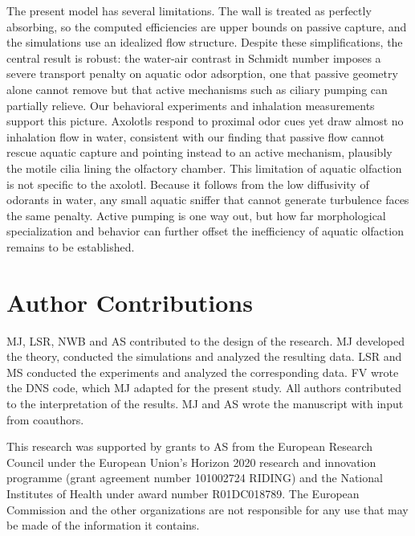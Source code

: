 \documentclass[%
 twocolumn,
 amsmath,amssymb,
 aps,prfluids,
 superscriptaddress,
]{revtex4-2}
\begin{document}
The present model has several limitations. The wall is treated as perfectly absorbing, so the computed efficiencies are upper bounds on passive capture, and the simulations use an idealized flow structure. Despite these simplifications, the central result is robust: the water-air contrast in Schmidt number imposes a severe transport penalty on aquatic odor adsorption, one that passive geometry alone cannot remove but that active mechanisms such as ciliary pumping can partially relieve. Our behavioral experiments and inhalation measurements support this picture. Axolotls respond to proximal odor cues yet draw almost no inhalation flow in water, consistent with our finding that passive flow cannot rescue aquatic capture and pointing instead to an active mechanism, plausibly the motile cilia lining the olfactory chamber. This limitation of aquatic olfaction is not specific to the axolotl. Because it follows from the low diffusivity of odorants in water, any small aquatic sniffer that cannot generate turbulence faces the same penalty. Active pumping is one way out, but how far morphological specialization and behavior can further offset the inefficiency of aquatic olfaction remains to be established.

\section*{Author Contributions}
MJ, LSR, NWB and AS contributed to the design of the research. MJ developed the theory, conducted the simulations and analyzed the resulting data. LSR and MS conducted the experiments and analyzed the corresponding data. FV wrote the DNS code, which MJ adapted for the present study. All authors contributed to the interpretation of the results. MJ and AS wrote the manuscript with input from coauthors.

\begin{acknowledgments}
This research was supported by grants to AS from the European Research Council under the European Union’s Horizon 2020 research and innovation programme (grant agreement number 101002724 RIDING) and the National Institutes of Health under award number R01DC018789. The European Commission and the other organizations are not responsible for any use that may be made of the information it contains.
\end{acknowledgments}

\makeatletter
\let\saved@hangfrom@section\@hangfrom@section
\let\saved@sectioncntformat\@sectioncntformat
\makeatother
\end{document}
